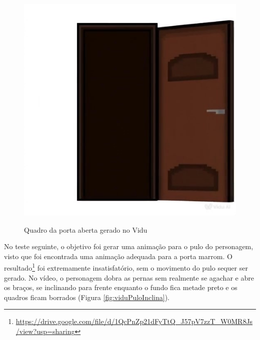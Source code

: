 \begin{figure}[htbp]
\begin{minipage}{0.32\textwidth}
    \label{fig:viduPortaDesconexao}
    \end{minipage}\hfill
    \begin{minipage}{0.32\textwidth}
    \centering
    \caption{\small Quadro da porta aberta gerado no Vidu}    \includegraphics[width=1\linewidth]{figs/vidu/framePortaAberta.jpg}
    \label{fig:viduPortaAberta}
    \end{minipage}\hfill
\end{figure}

No teste seguinte, o objetivo foi gerar uma animação para o pulo do personagem, visto que foi encontrada uma animação adequada para a porta marrom. O resultado\footnote{\url{https://drive.google.com/file/d/1QcPnZp21dFyTtQ_J57pV7zzT_W0MR8Js/view?usp=sharing}} foi extremamente insatisfatório, sem o movimento do pulo sequer ser gerado. No vídeo, o personagem dobra as pernas sem realmente se agachar e abre os braços, se inclinando para frente enquanto o fundo fica metade preto e os quadros ficam borrados (Figura \ref{fig:viduPuloInclina}).

